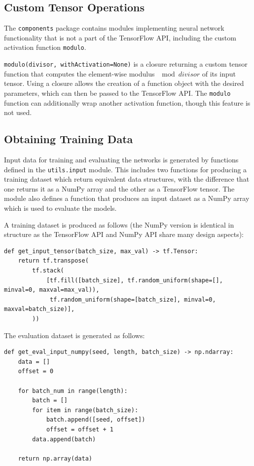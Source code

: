 \documentclass[12pt, titlepage]{report}
\theoremstyle{definition}
\begin{document}
\subsection{Custom Tensor Operations}\label{subsection:custom_ops}
The \texttt{components} package contains modules implementing neural network functionality that is not a part of the TensorFlow API, including the custom activation function \texttt{modulo}.

\texttt{modulo(divisor, withActivation=None)} is a closure returning a custom tensor function that computes the element-wise modulus $\mod{divisor}$ of its input tensor. Using a closure allows the creation of a function object with the desired parameters, which can then be passed to the TensorFlow API. The \texttt{modulo} function can additionally wrap another activation function, though this feature is not used.


\subsection{Obtaining Training Data}
Input data for training and evaluating the networks is generated by functions defined in the \texttt{utils.input} module. This includes two functions for producing a training dataset which return equivalent data structures, with the difference that one returns it as a NumPy array and the other as a TensorFlow tensor. The module also defines a function that produces an input dataset as a NumPy array which is used to evaluate the models.

A training dataset is produced as follows (the NumPy version is identical in structure as the TensorFlow API and NumPy API share many design aspects):

\begin{verbatim}
def get_input_tensor(batch_size, max_val) -> tf.Tensor:
    return tf.transpose(
        tf.stack(
            [tf.fill([batch_size], tf.random_uniform(shape=[], minval=0, maxval=max_val)),
             tf.random_uniform(shape=[batch_size], minval=0, maxval=batch_size)],
        ))
\end{verbatim}

The evaluation dataset is generated as follows:

\begin{verbatim}
def get_eval_input_numpy(seed, length, batch_size) -> np.ndarray:
    data = []
    offset = 0

    for batch_num in range(length):
        batch = []
        for item in range(batch_size):
            batch.append([seed, offset])
            offset = offset + 1
        data.append(batch)

    return np.array(data)
\end{verbatim}
\end{document}
